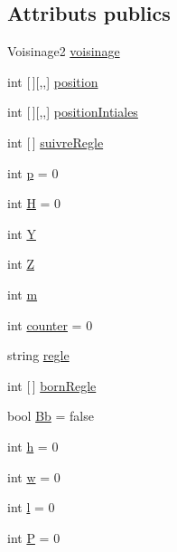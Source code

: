 \subsection*{Attributs publics}
\begin{DoxyCompactItemize}
\item 
Voisinage2 \mbox{\hyperlink{class_local_storage_a7c3473a8ec5d422f95955875319acb8d}{voisinage}}
\item 
int \mbox{[}$\,$\mbox{]}\mbox{[},,\mbox{]} \mbox{\hyperlink{class_local_storage_a135431eb0ae788b698b206b3cf12130d}{position}}
\item 
int \mbox{[}$\,$\mbox{]}\mbox{[},,\mbox{]} \mbox{\hyperlink{class_local_storage_ac396dd43ace1f6497cdf099e14475921}{position\+Intiales}}
\item 
int \mbox{[}$\,$\mbox{]} \mbox{\hyperlink{class_local_storage_a44b63fd921b38784a7055d5d2f115ffd}{suivre\+Regle}}
\item 
int \mbox{\hyperlink{class_local_storage_afd19ccbc719dd24bc66d271ca12f9917}{p}} = 0
\item 
int \mbox{\hyperlink{class_local_storage_ab55c19c1538c44a375aba42a518db233}{H}} = 0
\item 
int \mbox{\hyperlink{class_local_storage_af57f31509b004adeedf1b2df90f3a57b}{Y}}
\item 
int \mbox{\hyperlink{class_local_storage_a815d0b2c4b2cfc16fdfbbd5d2c7198bf}{Z}}
\item 
int \mbox{\hyperlink{class_local_storage_aa0b0024033d7e584459a0f278c1214c7}{m}}
\item 
int \mbox{\hyperlink{class_local_storage_a0e0c067f1347bf30ce06b9a3da2ce1f4}{counter}} = 0
\item 
string \mbox{\hyperlink{class_local_storage_a87f119194a8416674899540e1457d3f1}{regle}}
\item 
int \mbox{[}$\,$\mbox{]} \mbox{\hyperlink{class_local_storage_ae6bc493dae6af4907a7a406e0b8b382c}{born\+Regle}}
\item 
bool \mbox{\hyperlink{class_local_storage_aa9eacf4614847e9fa89306018c36457a}{Bb}} = false
\item 
int \mbox{\hyperlink{class_local_storage_ab025e3ab66a812167b739de8f636e72f}{h}} = 0
\item 
int \mbox{\hyperlink{class_local_storage_abac4c0cb7803f4f4438aba6a02a9eba2}{w}} = 0
\item 
int \mbox{\hyperlink{class_local_storage_a37e93f37b061a398e9d3cbfaf4c7fecd}{l}} = 0
\item 
int \mbox{\hyperlink{class_local_storage_a6ec9529fe0a479acbf1275d5bbcdeefb}{P}} = 0
\end{DoxyCompactItemize}
